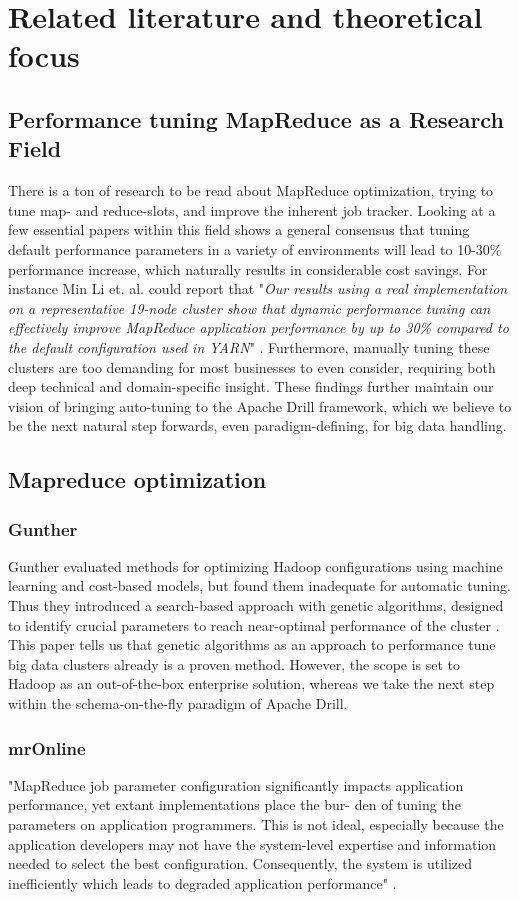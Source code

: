 \documentclass[a4paper,english]{report}
\begin{document}
	\section{Related literature and theoretical focus}
		\subsection{Performance tuning MapReduce as a Research Field}
		There is a ton of research to be read about MapReduce optimization, trying to tune map- and reduce-slots, and improve the inherent job tracker. Looking at a few essential papers within this field shows a general consensus that tuning default performance parameters in a variety of environments will lead to 10-30\% performance increase, which naturally results in considerable cost savings. For instance Min Li et. al. could report that "\textit{Our results using a real implementation on a representative 19-node cluster show that dynamic performance tuning can effectively improve MapReduce application performance by up to 30\% compared to the default configuration used in YARN}" \cite{mronline}. Furthermore, manually tuning these clusters are too demanding for most businesses to even consider, requiring both deep technical and domain-specific insight. These findings further maintain our vision of bringing auto-tuning to the Apache Drill framework, which we believe to be the next natural step forwards, even paradigm-defining, for big data handling.
	
		\subsection{Mapreduce optimization}
			\subsubsection{Gunther}
			Gunther evaluated methods for optimizing Hadoop configurations using machine learning and cost-based models, but found them inadequate for automatic tuning. Thus they introduced a search-based approach with genetic algorithms, designed to identify crucial parameters to reach near-optimal performance of the cluster \cite{gunther}. This paper tells us that genetic algorithms as an approach to performance tune big data clusters already is a proven method. However, the scope is set to Hadoop as an out-of-the-box enterprise solution, whereas we take the next step within the schema-on-the-fly paradigm of Apache Drill.
			
			\subsubsection{mrOnline}
			"MapReduce job parameter configuration significantly impacts
			application performance, yet extant implementations place the bur-
			den of tuning the parameters on application programmers. This is
			not ideal, especially because the application developers may not
			have the system-level expertise and information needed to select
			the best configuration. Consequently, the system is utilized inefficiently which leads to degraded application performance" \cite{mronline}.
			
\end{document}
